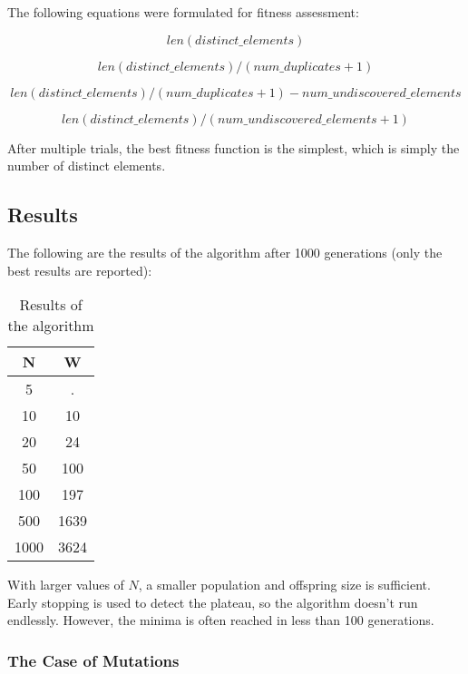 The following equations were formulated for fitness assessment:

\begin{equation}
  len(distinct\_elements)
\end{equation}

\begin{equation}
  len(distinct\_elements) / (num\_duplicates + 1)
\end{equation}

\begin{equation}
  len(distinct\_elements) / (num\_duplicates + 1) - num\_undiscovered\_elements
\end{equation}

\begin{equation}
  len(distinct\_elements) / (num\_undiscovered\_elements + 1)
\end{equation}

After multiple trials, the best fitness function is the simplest, which is simply the number of distinct elements.

\subsection{Results}

The following are the results of the algorithm after 1000 generations (only the best results are reported):

\begin{table}
  \centering
  \begin{tabular}{|c|c|}
    \hline
    N & W \\
    \hline
    5 & . \\
    10 & 10 \\
    20 & 24 \\
    50 & 100 \\
    100 & 197 \\
    500 & 1639 \\
    1000 & 3624 \\
    \hline
  \end{tabular}
  \caption{Results of the algorithm}

\end{table}

With larger values of $N$, a smaller population and offspring size is sufficient. Early stopping is used to detect the plateau, so the algorithm doesn't run endlessly. However, the minima is often reached in less than 100 generations.

\subsubsection{The Case of Mutations}


